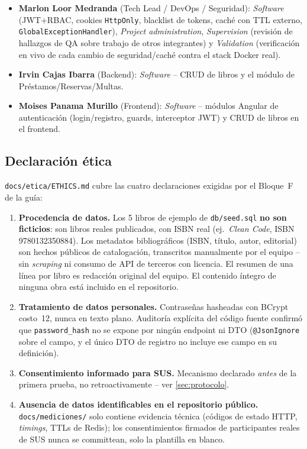 \documentclass[12pt,a4paper]{article}
\begin{document}
\begin{itemize}[leftmargin=1.2cm]
  \item \textbf{Marlon Loor Medranda} (Tech Lead / DevOps / Seguridad):
    \emph{Software} (JWT+RBAC, cookies \texttt{HttpOnly}, blacklist de
    tokens, caché con TTL externo, \texttt{GlobalExceptionHandler}),
    \emph{Project administration}, \emph{Supervision} (revisión de
    hallazgos de QA sobre trabajo de otros integrantes) y
    \emph{Validation} (verificación en vivo de cada cambio de
    seguridad/caché contra el stack Docker real).
  \item \textbf{Irvin Cajas Ibarra} (Backend): \emph{Software} -- CRUD de
    libros y el módulo de Préstamos/Reservas/Multas.
  \item \textbf{Moises Panama Murillo} (Frontend): \emph{Software} --
    módulos Angular de autenticación (login/registro, guards,
    interceptor JWT) y CRUD de libros en el frontend.
\end{itemize}

\subsection{Declaración ética}

\texttt{docs/etica/ETHICS.md} cubre las cuatro declaraciones exigidas por
el Bloque~F de la guía:

\begin{enumerate}[leftmargin=1.2cm]
  \item \textbf{Procedencia de datos.} Los 5 libros de ejemplo de
    \texttt{db/seed.sql} \textbf{no son ficticios}: son libros reales
    publicados, con ISBN real (ej.\ \emph{Clean Code}, ISBN
    9780132350884). Los metadatos bibliográficos (ISBN, título, autor,
    editorial) son hechos públicos de catalogación, transcritos
    manualmente por el equipo -- sin \emph{scraping} ni consumo de API de
    terceros con licencia. El resumen de una línea por libro es redacción
    original del equipo. El contenido íntegro de ninguna obra está
    incluido en el repositorio.
  \item \textbf{Tratamiento de datos personales.} Contraseñas hasheadas
    con BCrypt costo~12, nunca en texto plano. Auditoría explícita del
    código fuente confirmó que \texttt{password\_hash} no se expone por
    ningún endpoint ni DTO (\texttt{@JsonIgnore} sobre el campo, y el
    único DTO de registro no incluye ese campo en su definición).
  \item \textbf{Consentimiento informado para SUS.} Mecanismo declarado
    \emph{antes} de la primera prueba, no retroactivamente -- ver
    \autoref{sec:protocolo}.
  \item \textbf{Ausencia de datos identificables en el repositorio
    público.} \texttt{docs/mediciones/} solo contiene evidencia técnica
    (códigos de estado HTTP, \emph{timings}, TTLs de Redis); los
    consentimientos firmados de participantes reales de SUS nunca se
    committean, solo la plantilla en blanco.
\end{enumerate}
\end{document}
